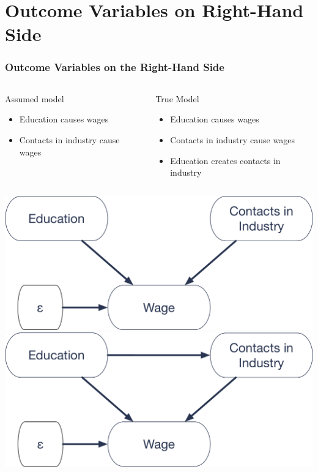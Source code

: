 \documentclass[12pt, block=fill]{beamer}
\begin{document}


\section{Outcome Variables on Right-Hand Side}


\begin{frame}
  \frametitle{Outcome Variables on the Right-Hand Side}


  \begin{columns}[t]
      \begin{block}{Assumed model}
        \begin{itemize}
        \item Education causes wages
        \item Contacts in industry cause wages
        \end{itemize} 
      \end{block}
      \begin{block}{True Model}
        \begin{itemize}
        \item Education causes wages 
        \item Contacts in industry cause wages 
        \item Education creates contacts in industry 
        \end{itemize} 
      \end{block}      
    \end{columns}
    \includegraphics[width=0.49\linewidth]{images/assumed_right_hand_side}
    \includegraphics[width=0.49\linewidth]{images/true_right_hand_side}


\end{frame}
\end{document}
